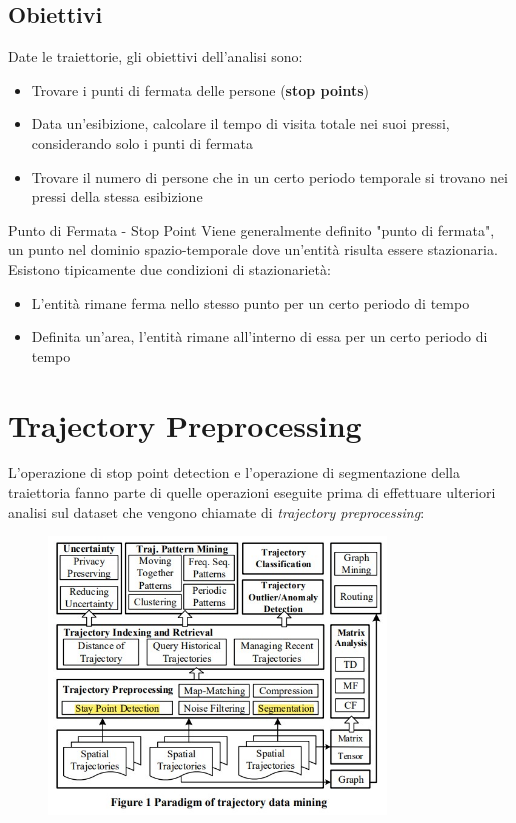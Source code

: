 \documentclass[12pt]{article}
\begin{document}
\subsection{Obiettivi}
Date le traiettorie, gli obiettivi dell'analisi sono:
\begin{itemize}
    \item Trovare i punti di fermata delle persone (\textbf{stop points})
    \item Data un'esibizione, calcolare il tempo di visita totale nei suoi pressi, considerando solo i punti di fermata
    \item Trovare il numero di persone che in un certo periodo temporale si trovano nei pressi della stessa esibizione
\end{itemize}
\begin{definition}{Punto di Fermata - Stop Point}{}
    Viene generalmente definito "punto di fermata", un punto nel dominio spazio-temporale dove un'entità risulta essere stazionaria. Esistono tipicamente due condizioni di stazionarietà:
    \begin{itemize}
        \item L'entità rimane ferma nello stesso punto per un certo periodo di tempo
        \item Definita un'area, l'entità rimane all'interno di essa per un certo periodo di tempo
    \end{itemize}
\end{definition}
\newpage
\section{Trajectory Preprocessing}
L'operazione di stop point detection e l'operazione di segmentazione della traiettoria fanno parte di quelle operazioni eseguite prima di effettuare ulteriori analisi sul dataset che vengono chiamate di \textit{trajectory preprocessing}:
\begin{figure}[htb!]
    \centering
    \includegraphics[width=0.8\textwidth]{images/spd.jpg}
\end{figure}
\FloatBarrier
\end{document}
